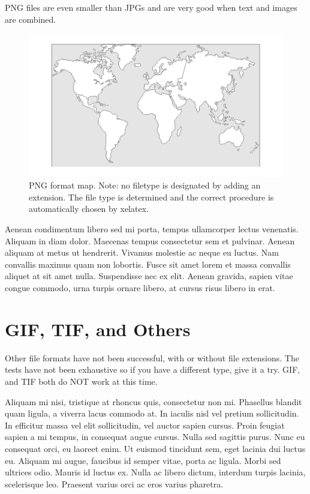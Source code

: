 PNG files are even smaller than JPGs and are very good when text and images are combined.

\begin{figure}[htbp]
  \centering
    \includegraphics[width=5in]{images/theworld}
    \caption[PNG format map. Note: no filetype is designated by adding an extension.]{PNG format map. Note: no filetype is designated by adding an extension. The file type is determined and the correct procedure is automatically chosen by xelatex.}
\end{figure}



Aenean condimentum libero sed mi porta, tempus ullamcorper lectus venenatis. Aliquam in diam dolor. Maecenas tempus consectetur sem et pulvinar. Aenean aliquam at metus ut hendrerit. Vivamus molestie ac neque eu luctus. Nam convallis maximus quam non lobortis. Fusce sit amet lorem et massa convallis aliquet at sit amet nulla. Suspendisse nec ex elit. Aenean gravida, sapien vitae congue commodo, urna turpis ornare libero, at cursus risus libero in erat. \cite{Rust94}

\section{GIF, TIF, and Others}

Other file formats have not been successful, with or without file extensions. The tests have not been exhaustive so if you have a different type, give it a try. GIF, and TIF both do NOT work at this time.

Aliquam mi nisi, tristique at rhoncus quis, consectetur non mi. Phasellus blandit quam ligula, a viverra lacus commodo at. In iaculis nisl vel pretium sollicitudin. In efficitur massa vel elit sollicitudin, vel auctor sapien cursus. Proin feugiat sapien a mi tempus, in consequat augue cursus. Nulla sed sagittis purus. Nunc eu consequat orci, eu laoreet enim. Ut euismod tincidunt sem, eget lacinia dui luctus eu. Aliquam mi augue, faucibus id semper vitae, porta ac ligula. Morbi sed ultrices odio. Mauris id luctus ex. Nulla ac libero dictum, interdum turpis lacinia, scelerisque leo. Praesent varius orci ac eros varius pharetra.



